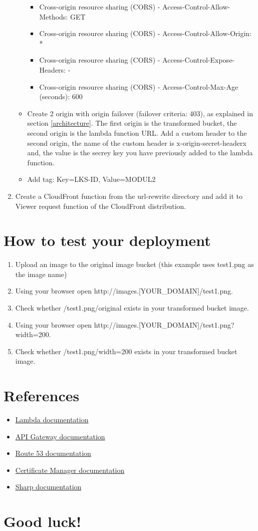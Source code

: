 \documentclass{article}
\begin{document}
\begin{enumerate}
\begin{itemize}
\begin{itemize}
      \item Cross-origin resource sharing (CORS) - Access-Control-Allow-Methods: GET
      \item Cross-origin resource sharing (CORS) - Access-Control-Allow-Origin: *
      \item Cross-origin resource sharing (CORS) - Access-Control-Expose-Headers: -
      \item Cross-origin resource sharing (CORS) - Access-Control-Max-Age (seconds): 600
    \end{itemize}
    \item Create 2 origin with origin failover (failover criteria: 403), as explained in section \ref{architecture}. The first origin is the transformed bucket, the second origin is the lambda function URL. Add a custom header to the second origin, the name of the custom header is x-origin-secret-headerx and, the value is the secrey key you have previously added to the lambda function.
    \item Add tag: Key=LKS-ID, Value=MODUL2
  \end{itemize}
  \item Create a CloudFront function from the url-rewrite directory and add it to Viewer request function of the CloudFront distribution.
\end{enumerate}
\section{How to test your deployment}
\begin{enumerate}
  \item Upload an image to the original image bucket (this example uses test1.png as the image name)
  \item Using your browser open http://images.[YOUR\_DOMAIN]/test1.png.
  \item Check whether /test1.png/original exists in your transformed bucket image.
  \item Using your browser open http://images.[YOUR\_DOMAIN]/test1.png?width=200.
  \item Check whether /test1.png/width=200 exists in your transformed bucket image.
\end{enumerate}
\section{References}\label{references}
\begin{itemize}
\item \href{https://docs.aws.amazon.com/lambda/latest/dg/welcome.html}{Lambda documentation}
\item \href{https://docs.aws.amazon.com/apigateway/latest/developerguide/welcome.html}{API Gateway documentation}
\item \href{https://docs.aws.amazon.com/Route53/latest/DeveloperGuide/Welcome.html}{Route 53 documentation}
\item \href{https://docs.aws.amazon.com/acm/latest/userguide/acm-overview.html}{Certificate Manager documentation}
\item \href{https://sharp.pixelplumbing.com/}{Sharp documentation}
\end{itemize}
\section*{Good luck!}
\end{document}
